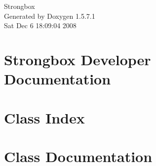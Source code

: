 \documentclass[a4paper]{book}
\begin{document}
\begin{titlepage}
\vspace*{7cm}
\begin{center}
{\Large Strongbox }\\
\vspace*{1cm}
{\large Generated by Doxygen 1.5.7.1}\\
\vspace*{0.5cm}
{\small Sat Dec 6 18:09:04 2008}\\
\end{center}
\end{titlepage}
\clearemptydoublepage
{}
\tableofcontents
\clearemptydoublepage
{}
\chapter{Strongbox Developer Documentation}
\label{index}\hypertarget{index}{}
\chapter{Class Index}

\chapter{Class Documentation}

















\printindex
\end{document}
